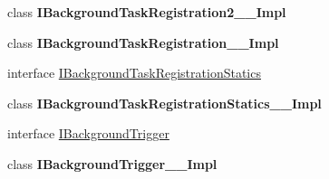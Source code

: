 \begin{DoxyCompactItemize}
\item 
class {\bfseries I\+Background\+Task\+Registration2\+\_\+\+\_\+\+Impl}
\item 
class {\bfseries I\+Background\+Task\+Registration\+\_\+\+\_\+\+Impl}
\item 
interface \hyperlink{interface_windows_1_1_application_model_1_1_background_1_1_i_background_task_registration_statics}{I\+Background\+Task\+Registration\+Statics}
\item 
class {\bfseries I\+Background\+Task\+Registration\+Statics\+\_\+\+\_\+\+Impl}
\item 
interface \hyperlink{interface_windows_1_1_application_model_1_1_background_1_1_i_background_trigger}{I\+Background\+Trigger}
\item 
class {\bfseries I\+Background\+Trigger\+\_\+\+\_\+\+Impl}
\end{DoxyCompactItemize}

